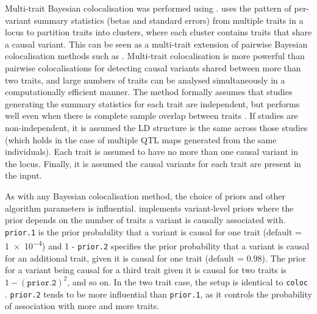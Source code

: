 Multi-trait Bayesian colocalisation was performed using  \autocite{foley2019FastEfficientColocalization}.
 uses the pattern of per-variant summary statistics (betas and standard errors) from multiple traits in a locus to partition traits into clusters, where each cluster contains traits that share a causal variant.
This can be seen as a multi-trait extension of pairwise Bayesian colocalisation methods such as  \autocite{giambartolomei2014BayesianTestColocalisation}.
Multi-trait colocalisation is more powerful than pairwise colocalisations for detecting causal variants shared between more than two traits,
and large numbers of traits can be analysed simultaneously in a computationally efficient manner.
The method formally assumes that studies generating the summary statistics for each trait are independent,
but performs well even when there is complete sample overlap between traits \autocite{foley2019FastEfficientColocalization}.
If studies are non-independent, 
it is assumed the \gls{LD} structure is the same across those studies (which holds in the case of multiple \gls{QTL} maps generated from the same individuals).
Each trait is assumed to have no more than one causal variant in the locus.
Finally, it is assumed the causal variants for each trait are present in the input.

As with any Bayesian colocalisation method, the choice of priors and other algorithm parameters is influential.
 implements variant-level priors where the prior depends on the number of traits a variant is causally associated with.
\texttt{prior.1} is the prior probability that a variant is causal for one trait (default = \num{1e-4}) and
1 - \texttt{prior.2} specifies the prior probability that a variant is causal for an additional trait, given it is causal for one trait (default = \num{0.98}).
The prior for a variant being causal for a third trait given it is causal for two traits is $1-(\texttt{prior.2})^2$, and so on.
In the two trait case, the setup is identical to \texttt{coloc} \autocite{giambartolomei2014BayesianTestColocalisation}.
\texttt{prior.2} tends to be more influential than \texttt{prior.1}, as it controls the probability of association with more and more traits.

